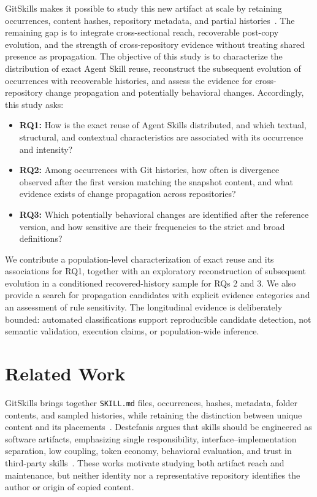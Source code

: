 \documentclass[conference]{IEEEtran}
\begin{document}
GitSkills makes it possible to study this new artifact at scale by retaining occurrences, content hashes, repository metadata, and partial histories~\cite{gitskills}. The remaining gap is to integrate cross-sectional reach, recoverable post-copy evolution, and the strength of cross-repository evidence without treating shared presence as propagation. The objective of this study is to characterize the distribution of exact Agent Skill reuse, reconstruct the subsequent evolution of occurrences with recoverable histories, and assess the evidence for cross-repository change propagation and potentially behavioral changes. Accordingly, this study asks:
\begin{itemize}
\item \textbf{RQ1:} How is the exact reuse of Agent Skills distributed, and which textual, structural, and contextual characteristics are associated with its occurrence and intensity?
\item \textbf{RQ2:} Among occurrences with Git histories, how often is divergence observed after the first version matching the snapshot content, and what evidence exists of change propagation across repositories?
\item \textbf{RQ3:} Which potentially behavioral changes are identified after the reference version, and how sensitive are their frequencies to the strict and broad definitions?
\end{itemize}
We contribute a population-level characterization of exact reuse and its associations for RQ1, together with an exploratory reconstruction of subsequent evolution in a conditioned recovered-history sample for RQs 2 and 3. We also provide a search for propagation candidates with explicit evidence categories and an assessment of rule sensitivity. The longitudinal evidence is deliberately bounded: automated classifications support reproducible candidate detection, not semantic validation, execution claims, or population-wide inference.


\section{Related Work}
GitSkills brings together \texttt{SKILL.md} files, occurrences, hashes, metadata, folder contents, and sampled histories, while retaining the distinction between unique content and its placements~\cite{gitskills}. Destefanis argues that skills should be engineered as software artifacts, emphasizing single responsibility, interface--implementation separation, low coupling, token economy, behavioral evaluation, and trust in third-party skills~\cite{authoring-skills}. These works motivate studying both artifact reach and maintenance, but neither identity nor a representative repository identifies the author or origin of copied content.
\end{document}
